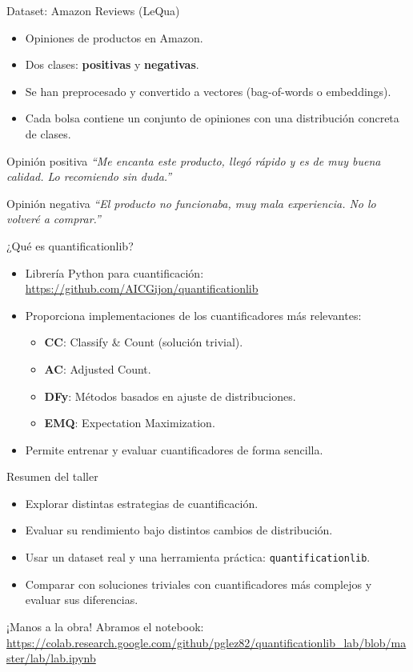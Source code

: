 \documentclass{beamer}
\begin{document}
\begin{frame}{Dataset: Amazon Reviews (LeQua)}
\begin{itemize}
    \item Opiniones de productos en Amazon.
    \item Dos clases: \textbf{positivas} y \textbf{negativas}.
    \item Se han preprocesado y convertido a vectores (bag-of-words o embeddings).
    \item Cada bolsa contiene un conjunto de opiniones con una distribución concreta de clases.
\end{itemize}
\begin{block}{Opinión positiva}
    \small
    \emph{“Me encanta este producto, llegó rápido y es de muy buena calidad. Lo recomiendo sin duda.”}
    \end{block}
    
    \begin{block}{Opinión negativa}
    \small
    \emph{“El producto no funcionaba, muy mala experiencia. No lo volveré a comprar.”}
    \end{block}
\end{frame}


\begin{frame}{¿Qué es quantificationlib?}
\begin{itemize}
    \item Librería Python para cuantificación: \url{https://github.com/AICGijon/quantificationlib}
    \item Proporciona implementaciones de los cuantificadores más relevantes:
    \begin{itemize}
        \item \textbf{CC}: Classify & Count (solución trivial).
        \item \textbf{AC}: Adjusted Count.
        \item \textbf{DFy}: Métodos basados en ajuste de distribuciones.
        \item \textbf{EMQ}: Expectation Maximization.
    \end{itemize}
    \item Permite entrenar y evaluar cuantificadores de forma sencilla.
\end{itemize}
\end{frame}

\begin{frame}{Resumen del taller}
\begin{itemize}
    \item Explorar distintas estrategias de cuantificación.
    \item Evaluar su rendimiento bajo distintos cambios de distribución.
    \item Usar un dataset real y una herramienta práctica: \texttt{quantificationlib}.
    \item Comparar con soluciones triviales con cuantificadores más complejos y evaluar sus diferencias.
\end{itemize}
\end{frame}

\begin{frame}{¡Manos a la obra!}
\centering
\Large
Abramos el notebook: \\
\url{https://colab.research.google.com/github/pglez82/quantificationlib_lab/blob/master/lab/lab.ipynb}
\end{frame}
\end{document}
